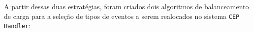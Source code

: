 A partir dessas duas estratégias, foram criados dois algoritmos de balanceamento de carga para a seleção de tipos de eventos a serem realocados no sistema \texttt{CEP Handler}:








